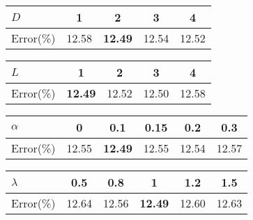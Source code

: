 \documentclass[runningheads]{llncs}
\begin{document}
  \begin{table*}[tb]
    \begin{minipage}[t]{0.475\textwidth}
    \centering\small
        \caption{ Results with different Transformer decoder layers $D$ for IC-MLM. We fix $L$ as 1.}
        \label{table:ablation:Llbl}
          \renewcommand\tabcolsep{3pt}
          \begin{tabular}{lcccc}
            \toprule
            $D$ &  1 &  2 & 3 & 4 \\
            \midrule
            Error(\%) &  12.58 & \textbf{12.49} & 12.54 & 12.52 \\
            \bottomrule
            \end{tabular}
    \end{minipage}
  \hfill
    \begin{minipage}[t]{0.475\textwidth}
    \centering\small
        \caption{Results with different Transformer decoder layers $L$ for attribute query network. We fix $D$ as 2.}
        \label{table:ablation:Latr}
          \renewcommand\tabcolsep{3pt}
          \begin{tabular}{lcccc}
            \toprule
            $L$ &  1 &  2 & 3 & 4 \\
            \midrule
            Error(\%) & \textbf{12.49} & 12.52 & 12.50 & 12.58 \\
            \bottomrule
            \end{tabular}
    \end{minipage}
  \end{table*}
  

\begin{table*}[tb]
  \begin{minipage}[t]{0.475\textwidth}
  \centering\small
      \caption{
        Results on the LFWA dataset with different mask ratios $\alpha$. 
      }
      \label{table:ablation:alpha}
        \renewcommand\tabcolsep{1pt}
        \begin{tabular}{lccccc}
          \toprule
          $\alpha$ & 0 &  0.1 & 0.15 & 0.2 &  0.3 \\
          \midrule
           Error(\%) & 12.55 & \textbf{12.49} & 12.55 & 12.54 & 12.57 \\
          \bottomrule
          \end{tabular}
  \end{minipage}
\hfill
  \begin{minipage}[t]{0.475\textwidth}
  \centering
      \caption{
        Results on the LFWA dataset with different coefficients $\lambda$.
      }
      \label{table:ablation:lambda}
        \renewcommand\tabcolsep{1pt}
        \begin{tabular}{lccccc}
          \toprule
          $\lambda$ & 0.5 &  0.8 & 1 & 1.2 &  1.5 \\
          \midrule
           Error(\%) & 12.64 & 12.56 & \textbf{12.49} & 12.60 & 12.63 \\
          \bottomrule
          \end{tabular}
  \end{minipage}
\end{table*}
\end{document}
